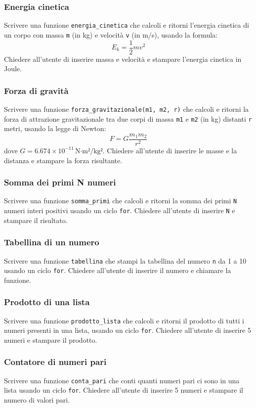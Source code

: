 \documentclass[a4paper,12pt]{article}
\begin{document}
	\subsubsection{Energia cinetica}
	Scrivere una funzione \texttt{energia\_cinetica} che calcoli e ritorni l'energia cinetica di un corpo con massa \texttt{m} (in kg) e velocità \texttt{v} (in m/s), usando la formula:  
	\[
	E_k = \frac{1}{2} m v^2
	\]  
	Chiedere all'utente di inserire massa e velocità e stampare l'energia cinetica in Joule.
	
	\subsubsection{Forza di gravità}
	Scrivere una funzione \texttt{forza\_gravitazionale(m1, m2, r)} che calcoli e ritorni la forza di attrazione gravitazionale tra due corpi di massa \texttt{m1} e \texttt{m2} (in kg) distanti \texttt{r} metri, usando la legge di Newton:  
	\[
	F = G \frac{m_1 m_2}{r^2}
	\]  
	dove \( G = 6.674 \times 10^{-11} \, \text{N·m²/kg²} \).  
	Chiedere all'utente di inserire le masse e la distanza e stampare la forza risultante.
	
	\subsubsection{Somma dei primi N numeri}
	Scrivere una funzione \texttt{somma\_primi} che calcoli e ritorni la somma dei primi \texttt{N} numeri interi positivi usando un ciclo \texttt{for}.  
	Chiedere all'utente di inserire \texttt{N} e stampare il risultato.
	
	\subsubsection{Tabellina di un numero}
	Scrivere una funzione \texttt{tabellina} che stampi la tabellina del numero \texttt{n} da 1 a 10 usando un ciclo \texttt{for}.  
	Chiedere all'utente di inserire il numero e chiamare la funzione.
	
	\subsubsection{Prodotto di una lista}
	Scrivere una funzione \texttt{prodotto\_lista} che calcoli e ritorni il prodotto di tutti i numeri presenti in una lista, usando un ciclo \texttt{for}.  
	Chiedere all'utente di inserire 5 numeri e stampare il prodotto.
	
	\subsubsection{Contatore di numeri pari}
	Scrivere una funzione \texttt{conta\_pari} che conti quanti numeri pari ci sono in una lista usando un ciclo \texttt{for}.  
	Chiedere all'utente di inserire 5 numeri e stampare il numero di valori pari.
	
\end{document}
